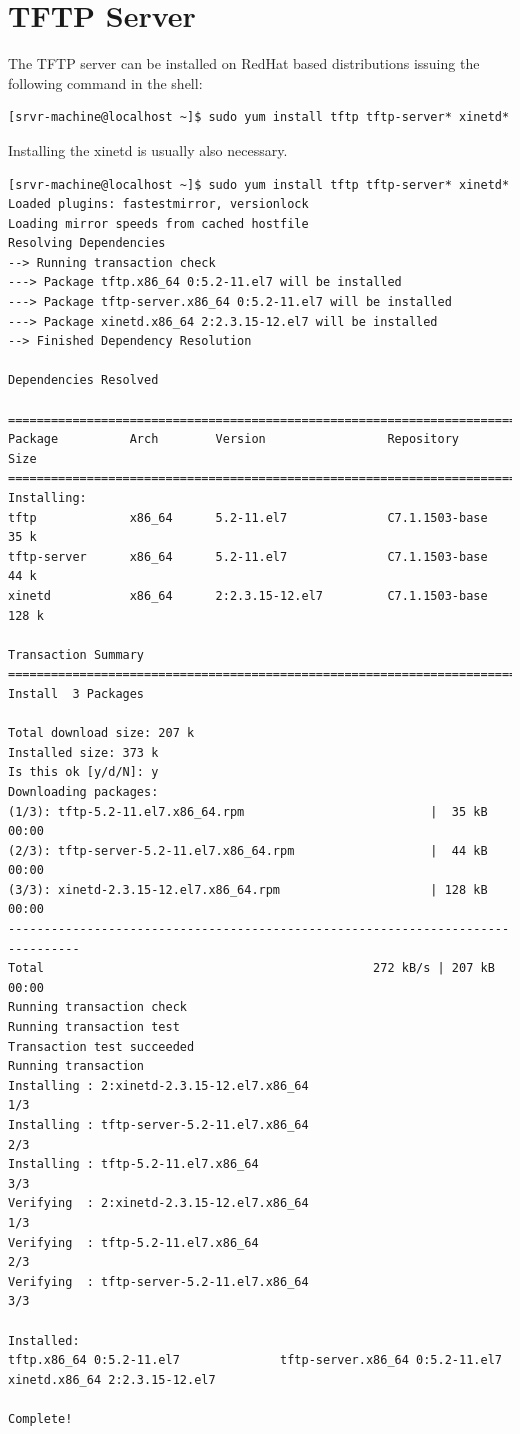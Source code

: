 \documentclass[11pt
  , a4paper
  , article
  , oneside
  , showtrims
]{memoir}
\begin{document}
\iffalse
\section{TFTP Server}
The TFTP server can be installed on RedHat based distributions issuing the following command in the shell:
\begin{lstlisting}[style=termstyle]
[srvr-machine@localhost ~]$ sudo yum install tftp tftp-server* xinetd*
\end{lstlisting}

Installing the xinetd is usually also necessary.

\begin{lstlisting}[style=termstyle]
[srvr-machine@localhost ~]$ sudo yum install tftp tftp-server* xinetd*
Loaded plugins: fastestmirror, versionlock
Loading mirror speeds from cached hostfile
Resolving Dependencies
--> Running transaction check
---> Package tftp.x86_64 0:5.2-11.el7 will be installed
---> Package tftp-server.x86_64 0:5.2-11.el7 will be installed
---> Package xinetd.x86_64 2:2.3.15-12.el7 will be installed
--> Finished Dependency Resolution

Dependencies Resolved

================================================================================
Package          Arch        Version                 Repository           Size
================================================================================
Installing:
tftp             x86_64      5.2-11.el7              C7.1.1503-base       35 k
tftp-server      x86_64      5.2-11.el7              C7.1.1503-base       44 k
xinetd           x86_64      2:2.3.15-12.el7         C7.1.1503-base      128 k

Transaction Summary
================================================================================
Install  3 Packages

Total download size: 207 k
Installed size: 373 k
Is this ok [y/d/N]: y
Downloading packages:
(1/3): tftp-5.2-11.el7.x86_64.rpm                          |  35 kB   00:00     
(2/3): tftp-server-5.2-11.el7.x86_64.rpm                   |  44 kB   00:00     
(3/3): xinetd-2.3.15-12.el7.x86_64.rpm                     | 128 kB   00:00     
--------------------------------------------------------------------------------
Total                                              272 kB/s | 207 kB  00:00     
Running transaction check
Running transaction test
Transaction test succeeded
Running transaction
Installing : 2:xinetd-2.3.15-12.el7.x86_64                                1/3 
Installing : tftp-server-5.2-11.el7.x86_64                                2/3 
Installing : tftp-5.2-11.el7.x86_64                                       3/3 
Verifying  : 2:xinetd-2.3.15-12.el7.x86_64                                1/3 
Verifying  : tftp-5.2-11.el7.x86_64                                       2/3 
Verifying  : tftp-server-5.2-11.el7.x86_64                                3/3 

Installed:
tftp.x86_64 0:5.2-11.el7              tftp-server.x86_64 0:5.2-11.el7        
xinetd.x86_64 2:2.3.15-12.el7        

Complete!
\end{lstlisting}
\end{document}

